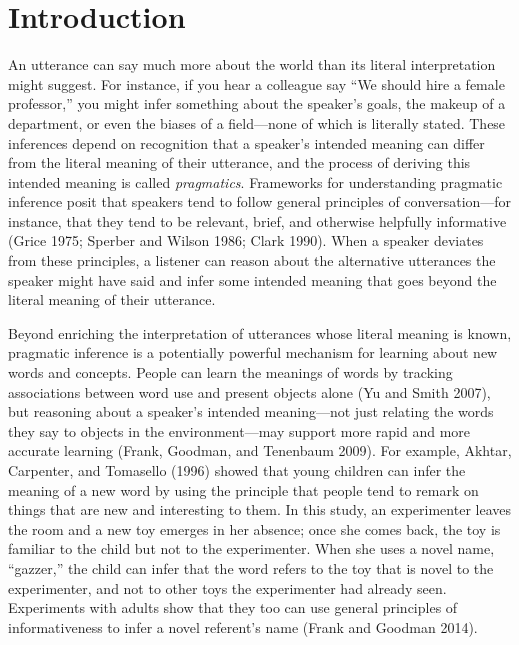 \documentclass{ucetd}
\begin{document}
\mainmatter
\hypertarget{introduction}{%
\chapter*{Introduction}\label{introduction}}

An utterance can say much more about the world than its literal
interpretation might suggest. For instance, if you hear a colleague say
``We should hire a female professor,'' you might infer something about
the speaker's goals, the makeup of a department, or even the biases of a
field---none of which is literally stated. These inferences depend on
recognition that a speaker's intended meaning can differ from the
literal meaning of their utterance, and the process of deriving this
intended meaning is called \emph{pragmatics}. Frameworks for
understanding pragmatic inference posit that speakers tend to follow
general principles of conversation---for instance, that they tend to be
relevant, brief, and otherwise helpfully informative (Grice 1975;
Sperber and Wilson 1986; Clark 1990). When a speaker deviates from these
principles, a listener can reason about the alternative utterances the
speaker might have said and infer some intended meaning that goes beyond
the literal meaning of their utterance.

Beyond enriching the interpretation of utterances whose literal meaning
is known, pragmatic inference is a potentially powerful mechanism for
learning about new words and concepts. People can learn the meanings of
words by tracking associations between word use and present objects
alone (Yu and Smith 2007), but reasoning about a speaker's intended
meaning---not just relating the words they say to objects in the
environment---may support more rapid and more accurate learning (Frank,
Goodman, and Tenenbaum 2009). For example, Akhtar, Carpenter, and
Tomasello (1996) showed that young children can infer the meaning of a
new word by using the principle that people tend to remark on things
that are new and interesting to them. In this study, an experimenter
leaves the room and a new toy emerges in her absence; once she comes
back, the toy is familiar to the child but not to the experimenter. When
she uses a novel name, ``gazzer,'' the child can infer that the word
refers to the toy that is novel to the experimenter, and not to other
toys the experimenter had already seen. Experiments with adults show
that they too can use general principles of informativeness to infer a
novel referent's name (Frank and Goodman 2014).
\end{document}
